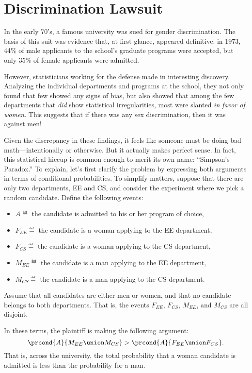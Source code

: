 \section{Discrimination Lawsuit}\label{discrimination_subsec}

In the early 70's, a famous university was sued for gender
discrimination.  The basis of this suit was evidence that, at first
glance, appeared definitive: in 1973, 44\% of male applicants to the
school's graduate programs were accepted, but only 35\% of female
applicants were admitted.

However, statisticians working for the defense made in interesting
discovery.  Analyzing the individual departments and programs at the
school, they not only found that few showed any signs of bias, but
also showed that among the few departments that \emph{did} show
statistical irregularities, most were slanted \emph{in favor of women}.
This suggests that if there was any sex discrimination, then it was
against men!  

Given the discrepancy in these findings, it feels like someone must be
doing bad math---intentionally or otherwise.  But it actually makes
perfect sense.  In fact, this statistical hiccup is common enough to
merit its own name: ``Simpson's Paradox.'' To explain, let's first
clarify the problem by expressing both arguments in terms of
conditional probabilities.  To simplify matters, suppose that there
are only two departments, EE and CS, and consider the experiment where
we pick a random candidate.  Define the following events:
%
\begin{itemize}
\item $A \eqdef$ the candidate is admitted to his or her program of choice,
\item $F_{EE} \eqdef$ the candidate is a woman applying to the EE department,
\item $F_{CS} \eqdef$ the candidate is a woman applying to the CS department,
\item $M_{EE} \eqdef$ the candidate is a man applying to the EE department,
\item $M_{CS} \eqdef$ the candidate is a man applying to the CS department.
\end{itemize}
Assume that all candidates are either men or women, and that no
candidate belongs to both departments.  That is, the events $F_{EE}$,
$F_{CS}$, $M_{EE}$, and $M_{CS}$ are all disjoint.

In these terms, the plaintiff is making the following argument:
\[
    \prcond{A}{M_{EE} \union M_{CS}} > \prcond{A}{F_{EE} \union F_{CS}}.
\]
That is, across the university, the total probability that a woman candidate
is admitted is less than the probability for a man.

